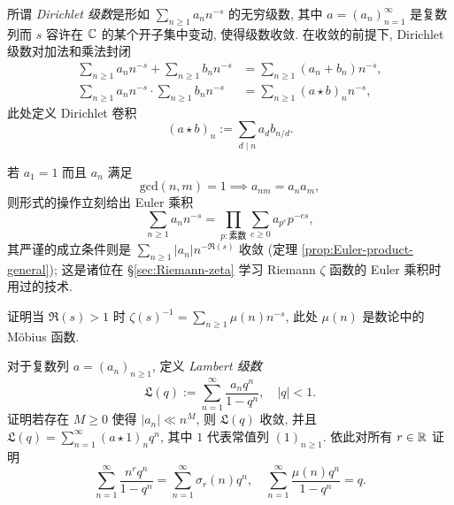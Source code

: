 所谓 \emph{Dirichlet 级数}是形如 $\sum_{n \geq 1} a_n n^{-s}$ 的无穷级数, 其中 $a = (a_n)_{n=1}^\infty$ 是复数列而 $s$ 容许在 $\mathbb{C}$ 的某个开子集中变动, 使得级数收敛. 在收敛的前提下, Dirichlet 级数对加法和乘法封闭
\begin{equation}\label{eqn:Dirichlet-convolution}\begin{aligned}
	\sum_{n \geq 1} a_n n^{-s} + \sum_{n \geq 1} b_n n^{-s} &= \sum_{n \geq 1} (a_n + b_n) n^{-s}, \\
	\sum_{n \geq 1} a_n n^{-s} \cdot \sum_{n \geq 1} b_n n^{-s} &= \sum_{n \geq 1} (a \star b)_n n^{-s},
\end{aligned}\end{equation}
此处定义 Dirichlet 卷积
\[ (a \star b)_n := \sum_{d \mid n} a_d b_{n/d}. \]

若 $a_1 = 1$ 而且 $a_n$ 满足
\[ \text{gcd}(n,m)=1 \implies a_{nm} = a_n a_m, \]
则形式的操作立刻给出 Euler 乘积
\[ \sum_{n \geq 1} a_n n^{-s} = \prod_{p: \text{素数}} \sum_{e \geq 0} a_{p^e} p^{-es}, \]
其严谨的成立条件则是 $\sum_{n \geq 1} |a_n| n^{-\Re(s)}$ 收敛 (定理 \ref{prop:Euler-product-general}); 这是诸位在 \S\ref{sec:Riemann-zeta} 学习 Riemann $\zeta$ 函数的 Euler 乘积时用过的技术.

\begin{exercise}
	证明当 $\Re(s) > 1$ 时 $\zeta(s)^{-1} = \sum_{n \geq 1} \mu(n) n^{-s}$, 此处 $\mu(n)$ 是数论中的 Möbius 函数.
\end{exercise}

\begin{exercise}\label{exo:Lambert}
	对于复数列 $a = (a_n)_{n \geq 1}$, 定义 \emph{Lambert 级数}
	\[ \mathfrak{L}(q) := \sum_{n=1}^\infty \frac{a_n q^n}{1 - q^n}, \quad |q| < 1. \]
	证明若存在 $M \geq 0$ 使得 $|a_n| \ll n^M$, 则 $\mathfrak{L}(q)$ 收敛, 并且 $\mathfrak{L}(q) = \sum_{n=1}^\infty (a \star 1)_n q^n$, 其中 $1$ 代表常值列 $(1)_{n \geq 1}$. 依此对所有 $r \in \mathbb{R}$ 证明
	\[
		\sum_{n=1}^\infty \frac{n^r q^n}{1 - q^n} = \sum_{n=1}^\infty \sigma_r(n) q^n, \quad
		\sum_{n=1}^\infty \frac{\mu(n) q^n}{1 - q^n} = q.
	\]
\end{exercise}


